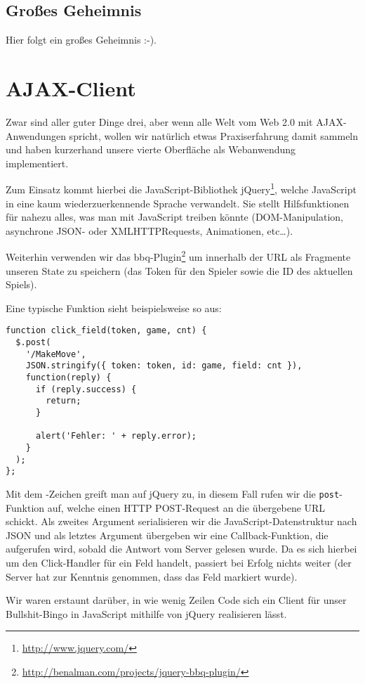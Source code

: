 \documentclass[12pt, a4paper]{scrartcl}
\begin{document}
\subsection{Großes Geheimnis}

Hier folgt ein großes Geheimnis :-).

\clearpage
\section{AJAX-Client}

Zwar sind aller guter Dinge drei, aber wenn alle Welt vom Web 2.0 mit
AJAX\--An\-wen\-dung\-en spricht, wollen wir natürlich etwas Praxiserfahrung damit
sammeln und haben kurzerhand unsere vierte Oberfläche als Webanwendung
implementiert.
\np

Zum Einsatz kommt hierbei die JavaScript-Bibliothek
jQuery\footnote{\url{http://www.jquery.com/}}, welche JavaScript in eine kaum
wiederzuerkennende Sprache verwandelt. Sie stellt Hilfsfunktionen für nahezu
alles, was man mit JavaScript treiben könnte (DOM-Manipulation, asynchrone
JSON- oder XMLHTTPRequests, Animationen, etc…).
\np

Weiterhin verwenden wir das
bbq-Plugin\footnote{\url{http://benalman.com/projects/jquery-bbq-plugin/}} um
innerhalb der URL als Fragmente unseren State zu speichern (das Token für den
Spieler sowie die ID des aktuellen Spiels).
\np

Eine typische Funktion sieht beispielsweise so aus:
\begin{lstlisting}
function click_field(token, game, cnt) {
  $.post(
    '/MakeMove',
    JSON.stringify({ token: token, id: game, field: cnt }),
    function(reply) {
      if (reply.success) {
        return;
      }

      alert('Fehler: ' + reply.error);
    }
  );
};
\end{lstlisting}

Mit dem \textdollar{}-Zeichen greift man auf jQuery zu, in diesem Fall rufen
wir die \texttt{post}-Funktion auf, welche einen HTTP POST-Request an die
übergebene URL schickt. Als zweites Argument serialisieren wir die
JavaScript-Datenstruktur nach JSON und als letztes Argument übergeben wir eine
Callback-Funktion, die aufgerufen wird, sobald die Antwort vom Server gelesen
wurde. Da es sich hierbei um den Click-Handler für ein Feld handelt, passiert
bei Erfolg nichts weiter (der Server hat zur Kenntnis genommen, dass das Feld
markiert wurde).
\np

Wir waren erstaunt darüber, in wie wenig Zeilen Code sich ein Client für unser
Bullshit-Bingo in JavaScript mithilfe von jQuery realisieren lässt.
\end{document}
